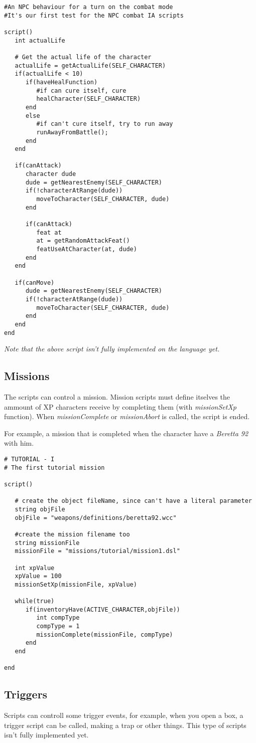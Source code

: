 \documentclass[ letterpaper,12pt]{article}
\begin{document}
\begin{verbatim}
#An NPC behaviour for a turn on the combat mode
#It's our first test for the NPC combat IA scripts

script()
   int actualLife

   # Get the actual life of the character
   actualLife = getActualLife(SELF_CHARACTER)
   if(actualLife < 10)
      if(haveHealFunction)
         #if can cure itself, cure
         healCharacter(SELF_CHARACTER)
      end
      else
         #if can't cure itself, try to run away
         runAwayFromBattle();
      end
   end

   if(canAttack)
      character dude
      dude = getNearestEnemy(SELF_CHARACTER)
      if(!characterAtRange(dude))
         moveToCharacter(SELF_CHARACTER, dude)
      end

      if(canAttack)
         feat at
         at = getRandomAttackFeat()
         featUseAtCharacter(at, dude)
      end
   end

   if(canMove)
      dude = getNearestEnemy(SELF_CHARACTER)
      if(!characterAtRange(dude))
         moveToCharacter(SELF_CHARACTER, dude)
      end
   end
end
\end{verbatim}

{\it Note that the above script isn't fully implemented on the language yet.}

\subsection{Missions}

The scripts can control a mission. Mission scripts must define itselves the
ammount of XP characters receive by completing them (with {\it missionSetXp}
function). When {\it missionComplete} or {\it missionAbort} is called, the
script is ended. 

For example, a mission that is completed when the character have a {\it Beretta
92} with him. 

\begin{verbatim}
# TUTORIAL - I
# The first tutorial mission

script()

   # create the object fileName, since can't have a literal parameter
   string objFile
   objFile = "weapons/definitions/beretta92.wcc"

   #create the mission filename too
   string missionFile
   missionFile = "missions/tutorial/mission1.dsl"

   int xpValue
   xpValue = 100
   missionSetXp(missionFile, xpValue)

   while(true)
      if(inventoryHave(ACTIVE_CHARACTER,objFile))
         int compType
         compType = 1
         missionComplete(missionFile, compType)
      end
   end

end

\end{verbatim}

\subsection{Triggers}

Scripts can controll some trigger events, for example, when you open a box, a
trigger script can be called, making a trap or other things. This type of
scripts isn't fully implemented yet.
\end{document}
